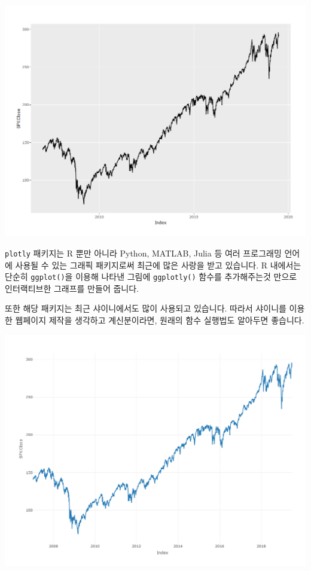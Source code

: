 \documentclass[12pt,]{book}
\newenvironment{Shaded}{\begin{snugshade}}{\end{snugshade}}
\newcommand{\DataTypeTok}[1]{\textcolor[rgb]{0.13,0.29,0.53}{#1}}
\newcommand{\KeywordTok}[1]{\textcolor[rgb]{0.13,0.29,0.53}{\textbf{#1}}}
\newcommand{\NormalTok}[1]{#1}
\newcommand{\OperatorTok}[1]{\textcolor[rgb]{0.81,0.36,0.00}{\textbf{#1}}}
\newcommand{\StringTok}[1]{\textcolor[rgb]{0.31,0.60,0.02}{#1}}
\begin{document}
\begin{center}\includegraphics[width=0.7\linewidth]{images/ggplotly} \end{center}

\texttt{plotly} 패키지는 R 뿐만 아니라 Python, MATLAB, Julia 등 여러 프로그래밍 언어에 사용될 수 있는 그래픽 패키지로써 최근에 많은 사랑을 받고 있습니다. R 내에서는 단순히 \texttt{ggplot()}을 이용해 나타낸 그림에 \texttt{ggplotly()} 함수를 추가해주는것 만으로 인터랙티브한 그래프를 만들어 줍니다.

또한 해당 패키지는 최근 샤이니에서도 많이 사용되고 있습니다. 따라서 샤이니를 이용한 웹페이지 제작을 생각하고 계신분이라면, 원래의 함수 실행법도 알아두면 좋습니다.

\begin{Shaded}
\end{Shaded}

\begin{center}\includegraphics[width=0.7\linewidth]{images/plotly} \end{center}
\end{document}
